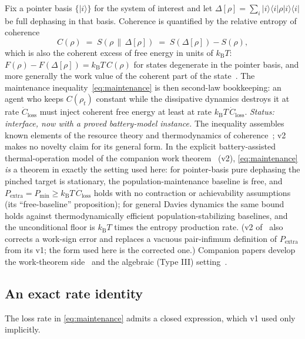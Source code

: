 \documentclass[11pt,a4paper]{article}
\theoremstyle{remark}
\newcommand{\kB}{k_{\mathrm{B}}}
\begin{document}
Fix a pointer basis $\{\lvert i\rangle\}$ for the system of interest and let
$\Delta[\rho] = \sum_i \lvert i\rangle\langle i\rvert \rho \lvert i\rangle\langle i\rvert$
be full dephasing in that basis. Coherence is quantified by the relative entropy of
coherence~\cite{Baumgratz2014,WinterYang2016,Streltsov2017}
\begin{equation}
  C(\rho) \;=\; S(\rho\,\|\,\Delta[\rho]) \;=\; S(\Delta[\rho]) - S(\rho),
\end{equation}
which is also the coherent excess of free energy in units of $\kB T$:
$F(\rho) - F(\Delta[\rho]) = \kB T\, C(\rho)$ for states degenerate in the pointer basis,
and more generally the work value of the coherent part of the
state~\cite{Lostaglio2015,Aberg2014,Marvian2014}. The maintenance
inequality~\eqref{eq:maintenance} is then second-law bookkeeping: an agent who keeps
$C(\rho_t)$ constant while the dissipative dynamics destroys it at rate
$\dot C_{\mathrm{loss}}$ must inject coherent free energy at least at rate
$\kB T\, \dot C_{\mathrm{loss}}$. \emph{Status: interface, now with a proved battery-model instance.} The inequality
assembles known elements of the resource theory and thermodynamics of
coherence~\cite{Lostaglio2015,Marvian2014,Aberg2014,Streltsov2017}; v2 makes no novelty
claim for its general form. In the explicit battery-assisted thermal-operation model of
the companion work theorem~\cite{Eriksson0061} (v2), \eqref{eq:maintenance} \emph{is} a
theorem in exactly the setting used here: for pointer-basis pure dephasing the pinched
target is stationary, the population-maintenance baseline is free, and
$P_{\mathrm{extra}} = P_{\min} \ge \kB T\,\dot C_{\mathrm{loss}}$ holds with no
contraction or achievability assumptions (its ``free-baseline'' proposition); for
general Davies dynamics the same bound holds against thermodynamically efficient
population-stabilizing baselines, and the unconditional floor is $\kB T$ times the
entropy production rate. (v2 of~\cite{Eriksson0061} also corrects a work-sign error and
replaces a vacuous pair-infimum definition of $P_{\mathrm{extra}}$ from its v1; the form
used here is the corrected one.) Companion papers develop the work-theorem
side~\cite{Eriksson0061,Eriksson0071} and the algebraic (Type III)
setting~\cite{Eriksson0060}.

\subsection{An exact rate identity}

The loss rate in \eqref{eq:maintenance} admits a closed expression, which v1 used only
implicitly.
\end{document}
